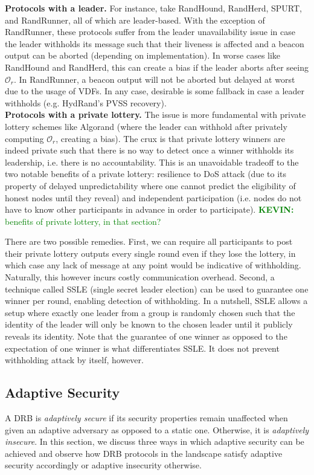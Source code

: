 \documentclass[letterpaper,twocolumn,10pt]{article}
\theoremstyle{definition}
\theoremstyle{remark}
\newcommand{\kevinnote}[1]{\textcolor{green}{\textbf{KEVIN:} #1}}
\begin{document}
\noindent\textbf{Protocols with a leader.} For instance, take RandHound, RandHerd, SPURT, and RandRunner, all of which are leader-based. With the exception of RandRunner, these protocols suffer from the leader unavailability issue in case the leader withholds its message such that their liveness is affected and a beacon output can be aborted (depending on implementation). In worse cases like RandHound and RandHerd, this can create a bias if the leader aborts after seeing $\mathcal{O}_r$. In RandRunner, a beacon output will not be aborted but delayed at worst due to the usage of VDFs. In any case, desirable is some fallback in case a leader withholds (e.g. HydRand's PVSS recovery).\\

\noindent\textbf{Protocols with a private lottery.} The issue is more fundamental with private lottery schemes like Algorand (where the leader can withhold after privately computing $\mathcal{O}_r$, creating a bias). The crux is that private lottery winners are indeed private such that there is no way to detect once a winner withholds its leadership, i.e. there is no accountability. This is an unavoidable tradeoff to the two notable benefits of a private lottery: resilience to DoS attack (due to its property of delayed unpredictability \cite{azouvi2018winning} where one cannot predict the eligibility of honest nodes until they reveal) and independent participation (i.e. nodes do not have to know other participants in advance in order to participate). \kevinnote{benefits of private lottery, in that section?}

There are two possible remedies. First, we can require all participants to post their private lottery outputs every single round even if they lose the lottery, in which case any lack of message at any point would be indicative of withholding. Naturally, this however incurs costly communication overhead. Second, a technique called SSLE (single secret leader election) \cite{boneh2020single} can be used to guarantee one winner per round, enabling detection of withholding. In a nutshell, SSLE allows a setup where exactly one leader from a group is randomly chosen such that the identity of the leader will only be known to the chosen leader until it publicly reveals its identity. Note that the guarantee of one winner as opposed to the expectation of one winner is what differentiates SSLE. It does not prevent withholding attack by itself, however.

\subsection{Adaptive Security}
\label{subsection:adaptive}
A DRB is \textit{adaptively secure} if its security properties remain unaffected when given an adaptive adversary as opposed to a static one. Otherwise, it is \textit{adaptively insecure}. In this section, we discuss three ways in which adaptive security can be achieved and observe how DRB protocols in the landscape satisfy adaptive security accordingly or adaptive insecurity otherwise.
\end{document}
